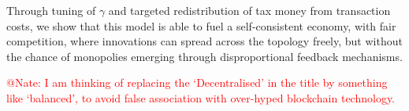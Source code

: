 \documentclass[a4paper,12pt]{article}
\newcommand{\red}[1]{\textcolor{red}{#1}} %
\begin{document}
Through tuning of $\gamma$ and targeted redistribution of tax money from transaction costs, we show that this model is able to fuel a self-consistent economy, 
with fair competition, where innovations can spread across the topology freely, but without the chance of monopolies emerging through disproportional feedback mechanisms. 

\red{
@Nate: I am thinking of replacing the `Decentralised' in the title by something like `balanced', to avoid false association with over-hyped blockchain technology.
}
\end{document}
